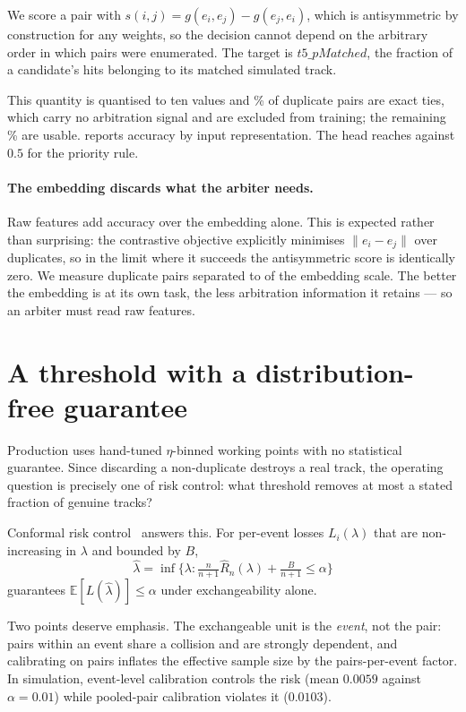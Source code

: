 \documentclass[11pt]{article}
\begin{document}
We score a pair with
$s(i,j) = g(e_i,e_j) - g(e_j,e_i)$, which is antisymmetric by construction for
any weights, so the decision cannot depend on the arbitrary order in which pairs
were enumerated. The target is $t5\_pMatched$, the fraction of a candidate's hits
belonging to its matched simulated track.

This quantity is quantised to ten values and \TieFraction\% of duplicate pairs
are exact ties, which carry no arbitration signal and are excluded from training;
the remaining \DecisiveFraction\% are usable.  reports
accuracy by input representation. The head reaches \ArbAcc{} against $0.5$ for
the priority rule.

\paragraph{The embedding discards what the arbiter needs.} Raw features add
\ArbGain{} accuracy over the embedding alone. This is expected rather than
surprising: the contrastive objective explicitly minimises $\lVert e_i - e_j\rVert$
over duplicates, so in the limit where it succeeds the antisymmetric score is
identically zero. We measure duplicate pairs separated to \DupSep{} of the
embedding scale. The better the embedding is at its own task, the less
arbitration information it retains --- so an arbiter must read raw features.

\section{A threshold with a distribution-free guarantee}
\label{sec:conformal}

Production uses hand-tuned $\eta$-binned working points with no statistical
guarantee. Since discarding a non-duplicate destroys a real track, the operating
question is precisely one of risk control: what threshold removes at most a
stated fraction of genuine tracks?

Conformal risk control~\cite{crc} answers this. For per-event losses
$L_i(\lambda)$ that are non-increasing in $\lambda$ and bounded by $B$,
\begin{equation}
\hat{\lambda} = \inf\Big\{\lambda : \tfrac{n}{n+1}\hat{R}_n(\lambda) + \tfrac{B}{n+1} \le \alpha \Big\}
\end{equation}
guarantees $\mathbb{E}[L(\hat\lambda)] \le \alpha$ under exchangeability alone.

Two points deserve emphasis. The exchangeable unit is the \emph{event}, not the
pair: pairs within an event share a collision and are strongly dependent, and
calibrating on pairs inflates the effective sample size by the pairs-per-event
factor. In simulation, event-level calibration controls the risk (mean $0.0059$
against $\alpha=0.01$) while pooled-pair calibration violates it ($0.0103$).
\end{document}
